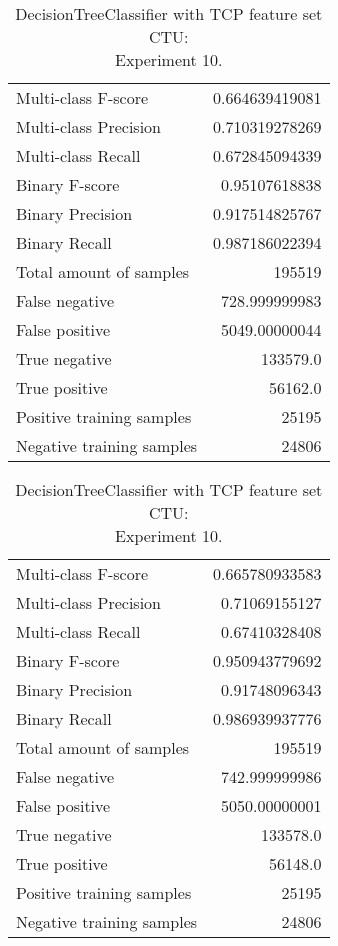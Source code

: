 \begin{table}[H]
\begin{minipage}{0.5\textwidth}
\caption{DecisionTreeClassifier with TCP feature set CTU: \\Experiment 9.}
\centering
\begin{tabular}{l r}
\toprule
Multi-class F-score & 0.664639419081 \\
Multi-class Precision & 0.710319278269 \\
Multi-class Recall & 0.672845094339 \\
\midrule
Binary F-score & 0.95107618838 \\
Binary Precision & 0.917514825767 \\
Binary Recall & 0.987186022394 \\
\midrule
Total amount of samples & 195519 \\
False negative & 728.999999983 \\
False positive & 5049.00000044 \\
True negative & 133579.0 \\
True positive & 56162.0 \\
\midrule
Positive training samples & 25195 \\
Negative training samples & 24806 \\
\bottomrule
\end{tabular}
\end{minipage}
\hfillx
\begin{minipage}{0.5\textwidth}
\caption{DecisionTreeClassifier with TCP feature set CTU: \\Experiment 10.}
\centering
\begin{tabular}{l r}
\toprule
Multi-class F-score & 0.665780933583 \\
Multi-class Precision & 0.71069155127 \\
Multi-class Recall & 0.67410328408 \\
\midrule
Binary F-score & 0.950943779692 \\
Binary Precision & 0.91748096343 \\
Binary Recall & 0.986939937776 \\
\midrule
Total amount of samples & 195519 \\
False negative & 742.999999986 \\
False positive & 5050.00000001 \\
True negative & 133578.0 \\
True positive & 56148.0 \\
\midrule
Positive training samples & 25195 \\
Negative training samples & 24806 \\
\bottomrule
\end{tabular}
\end{minipage}
\end{table}
